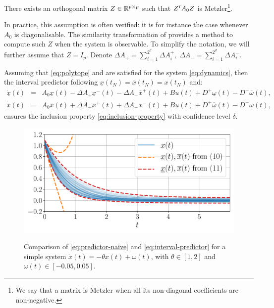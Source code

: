 \documentclass{article}
\begin{document}
\begin{assumption}
\label{assumpt:metzler}
There exists an orthogonal matrix $Z\in\mathbb{R}^{p\times p}$ such that $Z^{\mathsf{\scriptscriptstyle T}} A_0 Z$ is Metzler\footnote{We say that a matrix is Metzler when all its non-diagonal coefficients are non-negative.}.
\end{assumption}
In practice, this assumption is often verified: it is for instance the case whenever $A_0$ is diagonalisable. The similarity transformation of \citep{Efimov2013} provides a method to compute such $Z$ when the system is observable. To simplify the notation, we will further assume that $Z = I_p$. Denote $
\Delta A_{+}=\sum_{i=1}^{2^d}\Delta A_{i}^{+},\;\Delta A_{-}=\sum_{i=1}^{2^d}\Delta A_{i}^{-}$.

\begin{proposition}
\label{prop:predictor}
Assuming that \eqref{eq:polytope} and  are satisfied for the system \eqref{eq:dynamics}, then the interval predictor following $ \underline{x}(t_N)=\overline{x}(t_N)={x}(t_N)$ and:
\begin{eqnarray}
\dot{\underline{x}}(t) & = & A_{0}\underline{x}(t)-\Delta A_{+}\underline{x}^{-}(t)-\Delta A_{-}\overline{x}^{+}(t)  +Bu(t)+D^{+}\underline{\omega}(t)-D^{-}\overline{\omega}(t),\label{eq:interval-predictor}\\
\dot{\overline{x}}(t) & = & A_{0}\overline{x}(t)+\Delta A_{+}\overline{x}^{+}(t)+\Delta A_{-}\underline{x}^{-}(t)  +Bu(t)+D^{+}\overline{\omega}(t)-D^{-}\underline{\omega}(t),\nonumber
\end{eqnarray}
ensures the inclusion property \eqref{eq:inclusion-property} with confidence level $\delta$.
\end{proposition}

\begin{figure}[tp]
	\centering
	{\includegraphics[trim={0 0.6cm 0 0.4cm}, clip, width=0.6\linewidth]{img/interval-predictor}}
	\caption{Comparison of \eqref{eq:predictor-naive} and \eqref{eq:interval-predictor} for a simple system $\dot{x}(t)=-\theta x(t)+\omega(t)$, with $\theta\in[1, 2]$ and $\omega(t) \in [-0.05, 0.05]$.}
	\label{fig:predictor_example}
\end{figure}
\end{document}
